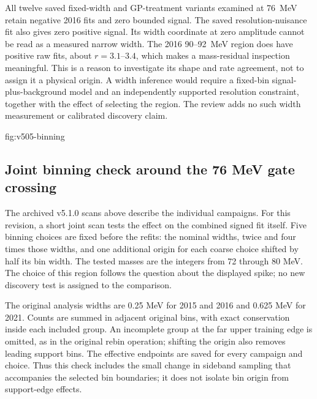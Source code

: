 All twelve saved fixed-width and GP-treatment variants examined at 76~MeV
retain negative 2016 fits and zero bounded signal. The saved resolution-nuisance
fit also gives zero positive signal. Its width coordinate at zero amplitude
cannot be read as a measured narrow width. The 2016 90--92~MeV region does
have positive raw fits, about $r=3.1$--$3.4$, which makes a mass-residual
inspection meaningful. This is a reason to investigate its shape and rate
agreement, not to assign it a physical origin. A width inference would require
a fixed-bin signal-plus-background model and an independently supported
resolution constraint, together with the effect of selecting the region.
The review adds no such width measurement or calibrated discovery claim.

{fig:v505-binning}

\subsection{Joint binning check around the 76 MeV gate crossing}
\label{app:v505-joint-binning}
The archived v5.1.0 scans above describe the individual campaigns. For this
revision, a short joint scan tests the effect on the combined signed fit
itself. Five binning choices are fixed before the refits: the nominal widths,
twice and four times those widths, and one additional origin for each coarse
choice shifted by half its bin width. The tested masses are the integers
from 72 through 80 MeV. The choice of this region follows the question about
the displayed spike; no new discovery test is assigned to the comparison.

The original analysis widths are 0.25 MeV for 2015 and 2016 and 0.625 MeV
for 2021. Counts are summed in adjacent original bins, with exact conservation
inside each included group. An incomplete group at the far upper training
edge is omitted, as in the original rebin operation; shifting the origin
also removes leading support bins. The effective endpoints are saved for
every campaign and choice. Thus this check includes the small change in
sideband sampling that accompanies the selected bin boundaries; it does not
isolate bin origin from support-edge effects.

